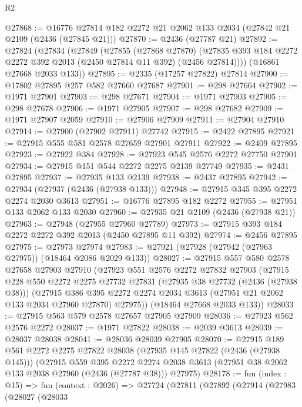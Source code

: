 \begin{lexlean}{R2}
\begin{coremodule}
@27868 := @16776 @27814 @182 @2272 @21 @2062 @133 @2034 (@27842 @21 @2109 (@2436 (@27845 @21)))
@27870 := @2436 (@27787 @21)
@27892 := @27824
    (@27834
      (@27849
        (@27855
          (@27868 @27870)
          (@27835 @393 @184 @2272 @2272 @392 @2013 (@2450 @27814 @11 @392) (@2456 @27814))))
      (@16861 @27668 @2033 @133))
@27895 := @2335 (@17257 @27822) @27814
@27900 := @17802 @27895 @257 @582 @27660 @27687
@27901 := @298 @27664
@27902 := @1971 @27901
@27903 := @298 @27671
@27904 := @1971 @27903
@27905 := @298 @27678
@27906 := @1971 @27905
@27907 := @298 @27682
@27909 := @1971 @27907 @2059
@27910 := @27906 @27909
@27911 := @27904 @27910
@27914 := @27900 (@27902 @27911) @27742
@27915 := @2422 @27895
@27921 := @27915 @555 @581 @2578 @27659 @27901 @27911
@27922 := @2409 @27895
@27923 := @27922 @384
@27928 := @27923 @545 @2576 @2272 @27750 @27901
@27934 := @27915 @151 @544 @2272 @2275 @2139 @27749
@27935 := @2431 @27895
@27937 := @27935 @133 @2139
@27938 := @2437 @27895
@27942 := @27934 (@27937 (@2436 (@27938 @133)))
@27948 := @27915 @345 @395 @2272 @2274 @2030 @3613
@27951 := @16776 @27895 @182 @2272
@27955 := @27951 @133 @2062 @133 @2030
@27960 := @27935 @21 @2109 (@2436 (@27938 @21))
@27963 := @27948 (@27955 @27960 @27789)
@27973 := @27915 @393 @184 @2272 @2272 @392 @2013 (@2450 @27895 @11 @392)
@27974 := @2456 @27895
@27975 := @27973 @27974
@27983 := @27921 (@27928 (@27942 (@27963 @27975)) (@18464 @2086 @2029 @133))
@28027 := @27915
    @557
    @580
    @2578
    @27658
    @27903
    @27910
    (@27923
      @551
      @2576
      @2272
      @27832
      @27903
      (@27915
        @228
        @550
        @2272
        @2275
        @27732
        @27831
        (@27935 @38 @27732 (@2436 (@27938 @38)))
        (@27915
          @386
          @395
          @2272
          @2274
          @2034
          @3613
          (@27951 @21 @2062 @133 @2034 @27960 @27870)
          @27975))
      (@18464 @27668 @2033 @133))
@28033 := @27915 @563 @579 @2578 @27657 @27905 @27909
@28036 := @27923 @562 @2576 @2272
@28037 := @1971 @27822
@28038 := @2039 @3613
@28039 := @28037 @28038
@28041 := @28036 @28039 @27905
@28070 := @27915
    @189
    @561
    @2272
    @2275
    @27822
    @28038
    (@27935 @145 @27822 (@2436 (@27938 @145)))
    (@27915
      @559
      @395
      @2272
      @2274
      @2038
      @3613
      (@27951 @38 @2062 @133 @2038 @27960 (@2436 (@27787 @38)))
      @27975)
@28178 := fun (index : @15) =>
  fun (context : @2026) =>
  @27724
    (@27811
      (@27892
        (@27914
          (@27983
            (@28027
              (@28033

\end{coremodule}
\end{lexlean}
